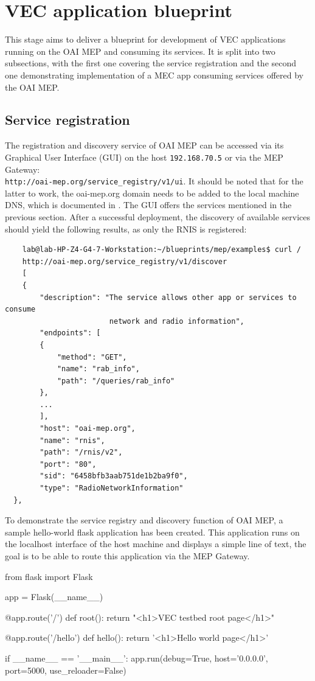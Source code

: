 \documentclass[12pt,a4paper,twoside]{report}
\begin{document}
\section{VEC application blueprint}
This stage aims to deliver a blueprint for development of VEC applications running on the OAI MEP and consuming its services. It is split into two subsections, with the first one covering the service registration and the second one demonstrating implementation of a MEC app consuming services offered by the OAI MEP.
%
\subsection{Service registration}
The registration and discovery service of OAI MEP can be accessed via its Graphical User Interface (GUI) on the host \verb |192.168.70.5| or via the MEP Gateway:\\\verb |http://oai-mep.org/service_registry/v1/ui|. It should be noted that for the latter to work, the oai-mep.org domain needs to be added to the local machine DNS, which is documented in \cite{oai-blueprint-git}. The GUI offers the services mentioned in the previous section. After a successful deployment, the discovery of available services should yield the following results, as only the RNIS is registered:
%
\begin{verbatim}
	lab@lab-HP-Z4-G4-7-Workstation:~/blueprints/mep/examples$ curl /
	http://oai-mep.org/service_registry/v1/discover 
	[
	{
		"description": "The service allows other app or services to consume
						network and radio information",
		"endpoints": [
		{
			"method": "GET",
			"name": "rab_info",
			"path": "/queries/rab_info"
		},
		...
		],
		"host": "oai-mep.org",
		"name": "rnis",
		"path": "/rnis/v2",
		"port": "80",
		"sid": "6458bfb3aab751de1b2ba9f0",
		"type": "RadioNetworkInformation"
  },
\end{verbatim}

To demonstrate the service registry and discovery function of OAI MEP, a sample hello-world flask application has been created. This application runs on the localhost interface of the host machine and displays a simple line of text, the goal is to be able to route this application via the MEP Gateway.
%
\begin{flask}[caption={Sample flask app in python}]
	from flask import Flask

	app = Flask(__name__)

	@app.route('/')
	def root():
		return "<h1>VEC testbed root page</h1>"

	@app.route('/hello')
	def hello():
		return '<h1>Hello world page</h1>'

	if __name__ == '__main__':
		app.run(debug=True, host='0.0.0.0', port=5000, use_reloader=False)
\end{flask}
\end{document}
